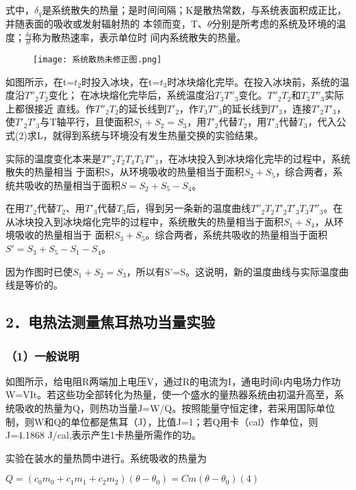 \documentclass[11pt,a4paper,oneside]{article}
\begin{document}
  式中，${\delta}_q$是系统散失的热量；是时间间隔；K是散热常数，与系统表面积成正比，并随表面的吸收或发射辐射热的
  本领而变，T、$\theta$分别是所考虑的系统及环境的温度；$\frac{\delta q}{\delta t}$称为散热速率，表示单位时
  间内系统散失的热量。
  
\begin{figure}[H]
 \centering
  \texttt{[image: 系统散热未修正图.png]}
\end{figure}

	如图所示，在t=$t_2$时投入冰块，在t=$t_3$时冰块熔化完毕。在投入冰块前，系统的温度沿${T''_2}{T_2}$变化；
	在冰块熔化完毕后，系统温度沿${T_3}{T''_3}$变化。${T''_2}{T_2}$和${T_3}{T''_3}$实际上都很接近
	直线。作${T''_2}{T_2}$的延长线到${T'_2}$，作${T_3}{T''_3}$的延长线到${T'_3}$，连接${T'_2}
	{T'_3}$，使${T'_2}{T'_3}$与T轴平行，且使面积${S_1}+{S_2}={S_3}$，用${T'_2}$代替${T_2}$，用${T'_3}$代替${T_3}$，代入公式(2)求L，就得到系统与环境没有发生热量交换的实验结果。
	
	实际的温度变化本来是${T''_2}{T_2}{T_4}{T_3}{T''_3}$，在冰块投入到冰块熔化完毕的过程中，系统散失的热量相当
	于面积S，从环境吸收的热量相当于面积${S_2}+{S_5}$，综合两者，系统共吸收的热量相当于面积$S={S_2}+{S_5}-{S_4}$。

  在用$T'_2$代替$T_2$、用$T'_3$代替$T_3$后，得到另一条新的温度曲线${T''_2}{T_2}{T'_2}{T'_3}{T_3}
  {T''_3}$。在从冰块投入到冰块熔化完毕的过程中，系统散失的热量相当于面积${S_1}+{S_4}$，从环境吸收的热量相当于      
  面积${S_3}+{S_5}$。综合两者，系统共吸收的热量相当于面积$S'={S_3}+{S_5}-{S_1}-{S_4}$。
	
	因为作图时已使${S_1}+{S_2}={S_3}$，所以有S'=S。这说明，新的温度曲线与实际温度曲线是等价的。

\subsection*{2．电热法测量焦耳热功当量实验}
\subsubsection*{（1）一般说明}
	如图所示，给电阻R两端加上电压V，通过R的电流为I，通电时间t内电场力作功W=VIt。若这些功全部转化为热量，使一个盛水的量热器系统由初温升高至，系统吸收的热量为Q，则热功当量J=W/Q。按照能量守恒定律，若采用国际单位制，则W和Q的单位都是焦耳（J），比值J=1；若Q用卡（cal）作单位，则J=4.1868 J/cal,表示产生1卡热量所需作的功。
	
	实验在装水的量热筒中进行。系统吸收的热量为
\begin{center}
$Q=(c_{0}m_{0}+c_{1}m_{1}+c_{2}m_{2})(\theta -\theta_{0})=Cm(\theta-\theta_{0})     (4)$
\end{center}
\end{document}
